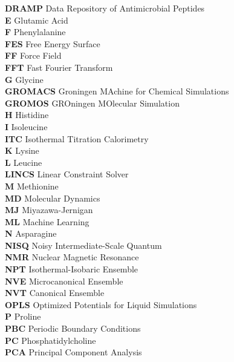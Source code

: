 \documentclass[12pt, twoside, openany]{book}
\begin{document}
\begin{flushleft}
\begin{tabbing}
        \textbf{DRAMP} \> Data Repository of Antimicrobial Peptides \\
        \textbf{E} \> Glutamic Acid \\
        \textbf{F} \> Phenylalanine \\
        \textbf{FES} \> Free Energy Surface \\
        \textbf{FF} \> Force Field \\
        \textbf{FFT} \> Fast Fourier Transform \\
        \textbf{G} \> Glycine \\
        \textbf{GROMACS} \> Groningen MAchine for Chemical Simulations \\
        \textbf{GROMOS} \> GROningen MOlecular Simulation \\
        \textbf{H} \> Histidine \\
        \textbf{I} \> Isoleucine \\
        \textbf{ITC} \> Isothermal Titration Calorimetry \\
        \textbf{K} \> Lysine \\
        \textbf{L} \> Leucine \\
        \textbf{LINCS} \> Linear Constraint Solver \\
        \textbf{M} \> Methionine \\
        \textbf{MD} \> Molecular Dynamics \\
        \textbf{MJ} \> Miyazawa-Jernigan \\
        \textbf{ML} \> Machine Learning \\
        \textbf{N} \> Asparagine \\
        \textbf{NISQ} \> Noisy Intermediate-Scale Quantum \\
        \textbf{NMR} \> Nuclear Magnetic Resonance \\
        \textbf{NPT} \> Isothermal-Isobaric Ensemble \\
        \textbf{NVE} \> Microcanonical Ensemble \\
        \textbf{NVT} \> Canonical Ensemble \\
        \textbf{OPLS} \> Optimized Potentials for Liquid Simulations \\
        \textbf{P} \> Proline \\
        \textbf{PBC} \> Periodic Boundary Conditions \\
        \textbf{PC} \> Phosphatidylcholine \\
        \textbf{PCA} \> Principal Component Analysis \\

\end{tabbing}
\end{flushleft}
\end{document}
